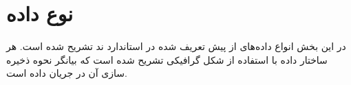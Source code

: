 
\chapter{نوع داده‌}


در این بخش انواع داده‌های از پیش تعریف شده در استاندارد ند تشریح شده است.
هر ساختار داده با استفاده از شکل گرافیکی تشریح شده است که بیانگر نحوه ذخیره سازی
آن در جریان داده است.
 
%

















% 
% 
% 
